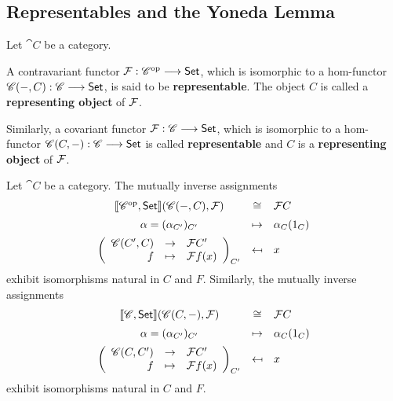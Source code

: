 	\newpage
	\subsection{Representables and the Yoneda Lemma}

	\begin{definition}
		Let $\cat{C}$ be a category. 

		A contravariant functor $\mathcal{F}:\mathscr{C}^{\text{op}} --> \textsf{Set}$, which is isomorphic to a hom-functor $\mathscr{C}(-,C):\mathscr{C}-->\textsf{Set}$, is said to be \textbf{representable}. The object $C$ is called a \textbf{representing object} of $\mathcal{F}$.

		Similarly, a covariant functor $\mathcal{F}:\mathscr{C} --> \textsf{Set}$, which is isomorphic to a hom-functor $\mathscr{C}(C,-):\mathscr{C}-->\textsf{Set}$ is called \textbf{representable} and $C$ is a \textbf{representing object} of $\mathcal{F}$.
	\end{definition}

	\begin{theorem}
		Let $\cat{C}$ be a category. The mutually inverse assignments
		\begin{align*}
			\begin{array}{ccl}
				|[\cat{C^\op,\ncat{Set}}|](\cat{C}(-,C),\fun{F}) &\isom& \fun{F}C
				\vspace{.5em}\\
				\alpha=(\alpha_{C'})_{C'} & \mapsto & \alpha_C(1_C)
				\vspace{.5em}\\
				\left(\begin{array}{rcl}
					\cat{C}(C',C) &\rightarrow& \fun{F}C'\\
				 	f & \mapsto & \fun{F}f(x)
				\end{array}\right)_{C'} & \mapsfrom & x
			\end{array}
		\end{align*}
		exhibit isomorphisms natural in $C$ and $F$. Similarly, the mutually inverse assignments
		\begin{align*}
			\begin{array}{ccl}
				|[\cat{C,\ncat{Set}}|](\cat{C}(C,-),\fun{F}) &\isom& \fun{F}C
				\vspace{.5em}\\
				\alpha=(\alpha_{C'})_{C'} & \mapsto & \alpha_C(1_C)
				\vspace{.5em}\\
				\left(\begin{array}{rcl}
				 	\cat{C}(C,C') &\rightarrow& \fun{F}C'\\
				 	f & \mapsto & \fun{F}f(x)
				\end{array}\right)_{C'} & \mapsfrom & x
			\end{array}
		\end{align*}
		exhibit isomorphisms natural in $C$ and $F$.
	\end{theorem}

